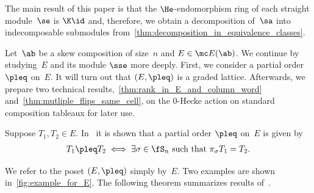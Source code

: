 The main result of this paper is that the $\He$-endomorphism ring of each straight module~$\se$ is $\K \id$ and, therefore, we obtain a decomposition of~$\sa$ into indecomposable submodules from~\cref{thm:decomposition_in_equivalence_classes}.


Let~$\ab$ be a skew composition of size~$n$ and $E\in \mc E(\ab)$.
 We continue by studying~$E$ and its module $\sse$ more deeply.
First, we consider a partial order $\pleq$ on~$E$.
It will turn out that $(E,\pleq)$ is a graded lattice.
Afterwards, we prepare two technical results,~\cref{thm:rank_in_E_and_column_word} and~\cref{thm:mutliple_flips_same_cell}, on the 0-Hecke action on standard composition tableaux for later use. 

Suppose $T_1,T_2\in E$. In~\cite[Section~4]{Tewari2015} it is shown that a partial order $\pleq$ on~$E$ is given by
\begin{align*}
	T_1 \pleq T_2 \iff \exists \sigma \in \fS_n \text{ such that } \pi_\sigma T_1 = T_2.
\end{align*}

 We refer to the poset $(E,\pleq)$ simply by~$E$. Two examples are shown in~\cref{fig:example_for_E}. The following theorem summarizes results of~\cite[Section~6]{Tewari2015}.



